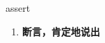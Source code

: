 
\begin{frame}
{\huge assert}
\begin{center}
\begin{enumerate}\Large
  \item \textbf{断言，肯定地说出}
\end{enumerate}
\end{center}
\end{frame}
